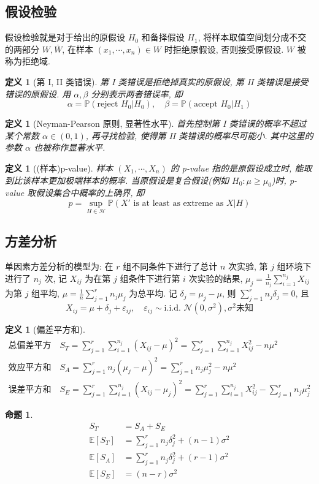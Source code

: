 \documentclass[8pt]{article}
\theoremstyle{compact}
\newtheorem{definition}[theorem]{定义}
\newtheorem{proposition}[theorem]{命题}
\def\ge{\geqslant}
\def\P#1{\mathbb{P}\left({#1}\right)}
\def\E#1{\mathbb{E}\left[{#1}\right]}
\begin{document}
\subsection{假设检验}
假设检验就是对于给出的原假设 $H_0$ 和备择假设 $H_1$, 将样本取值空间划分成不交的两部分 $W, \overline{W}$, 在样本 $(x_1, \cdots, x_n) \in W$ 时拒绝原假设, 否则接受原假设. $W$ 被称为拒绝域.
\begin{definition}[第 I, II 类错误]
	第 I 类错误是拒绝掉真实的原假设, 第 II 类错误是接受错误的原假设. 用 $\alpha, \beta$ 分别表示两者错误率, 即 $$\alpha = \P{\text{reject }H_0 | H_0}, \quad \beta = \P{\text{accept } H_0 | H_1}$$
\end{definition}
\begin{definition}[Neyman-Pearson 原则, 显著性水平]
首先控制第 I 类错误的概率不超过某个常数 $\alpha \in (0, 1)$, 再寻找检验, 使得第 II 类错误的概率尽可能小. 其中这里的参数 $\alpha$ 也被称作显著水平.
\end{definition}
\begin{definition}[(样本)p-value]
	样本 $(X_1, \cdots, X_n)$ 的 p-value 指的是原假设成立时, 能取到比该样本更加极端样本的概率. 当原假设是复合假设(例如 $H_0: \mu \ge \mu_0$)时, p-value 取假设集合中概率的上确界, 即 $$p = \sup_{H \in \mathcal H}\P{X' \text{ is at least as extreme as } X | H}$$
\end{definition}
\subsection{方差分析}
单因素方差分析的模型为: 在 $r$ 组不同条件下进行了总计 $n$ 次实验, 第 $j$ 组环境下进行了 $n_j$ 次, 记 $X_{ij}$ 为在第 $j$ 组条件下进行第 $i$ 次实验的结果, $\mu_j = \frac{1}{n_j}\sum_{i=1}^{n_j}X_{ij}$ 为第 $j$ 组平均, $\mu = \frac{1}{n}\sum_{j=1}^{r}n_j\mu_j$ 为总平均. 记 $\delta_j = \mu_j - \mu$, 则 $\sum_{j=1}^r n_j\delta_j = 0$, 且 $$X_{ij} = \mu + \delta_j + \varepsilon_{ij}, \quad \varepsilon_{ij} \sim \text{i.i.d. }\mathcal N(0, \sigma^2), \sigma^2\mbox{未知}$$
\begin{definition}[偏差平方和]
	\begin{align*}
		\mbox{总偏差平方和} \qquad & S_T = \sum_{j=1}^r \sum_{i=1}^{n_j} (X_{ij} - \mu)^2 = \sum_{j=1}^r \sum_{i=1}^{n_j}X_{ij}^2 - n\mu^2 \\
		\mbox{效应平方和} \qquad& S_A = \sum_{j=1}^r n_j(\mu_j - \mu)^2 = \sum_{j=1}^rn_j\mu_j^2 - n\mu^2 \\
		\mbox{误差平方和} \qquad& S_E = \sum_{j=1}^r \sum_{i=1}^{n_j} (X_{ij} - \mu_j)^2 = \sum_{j=1}^r \sum_{i=1}^{n_j}X_{ij}^2 - \sum_{j=1}^rn_j\mu_j^2
	\end{align*}
\end{definition}
\begin{proposition}
	\begin{align*}
		S_T &= S_A + S_E \\
		\E{S_T} &= \sum_{j=1}^{r} n_j\delta_j^2 + (n - 1)\sigma^2 \\
		\E{S_A} &= \sum_{j=1}^{r} n_j\delta_j^2 + (r - 1)\sigma^2 \\
		\E{S_E} &= (n - r)\sigma^2
	\end{align*}
\end{proposition}
\end{document}
